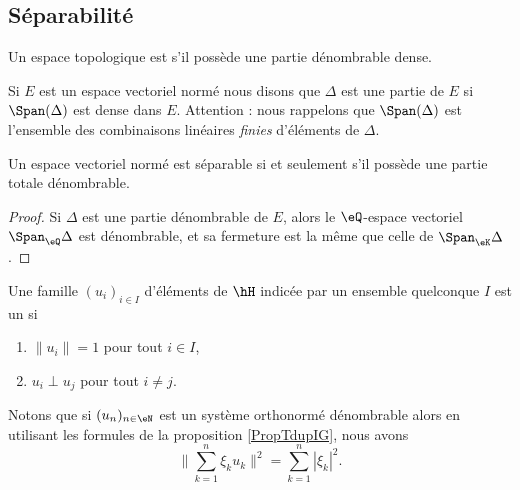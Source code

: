 \subsection{Séparabilité}

\begin{definition}      \label{DEFooSFOJooGICSbT}
    Un espace topologique est  s'il possède une partie dénombrable dense.
\end{definition}

\begin{definition}      \label{DEFooQVPHooJaSWyF}
    Si \( E\) est un espace vectoriel normé nous disons que \( \Delta\) est une partie  de \( E\) si \( \Span(\Delta)\) est dense dans \( E\). Attention : nous rappelons que \( \Span(\Delta)\) est l'ensemble des combinaisons linéaires \emph{finies} d'éléments de \( \Delta\).
\end{definition}

\begin{proposition}     \label{PROPooZMWHooVwvNBY}
    Un espace vectoriel normé est séparable si et seulement s'il possède une partie totale dénombrable.
\end{proposition}

\begin{proof}
    Si \( \Delta\) est une partie dénombrable de \( E\), alors le \( \eQ\)-espace vectoriel \( \Span_{\eQ}\Delta\) est dénombrable, et sa fermeture est la même que celle de \( \Span_{\eK}\Delta\).
\end{proof}

\begin{definition}
    Une famille \( (u_i)_{i\in I}\) d'éléments de \( \hH\) indicée par un ensemble quelconque \( I\) est un 
     si
    \begin{enumerate}
        \item
            \( \| u_i \|=1\) pour tout \( i\in I\),
        \item
            \( u_i\perp u_j\) pour tout \( i\neq j\).
    \end{enumerate}
\end{definition}
Notons que si \( (u_n)_{n\in \eN}\) est un système orthonormé dénombrable alors en utilisant les formules de la proposition \ref{PropTdupIG}, nous avons
\begin{equation}    \label{EqCLQbMy}
    \big\| \sum_{k=1}^n\xi_ku_k \big\|^2=\sum_{k=1}^n| \xi_k |^2.
\end{equation}

